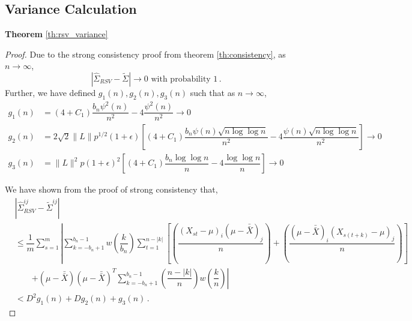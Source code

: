 \documentclass[12pt]{article}
\theoremstyle{remark}
\begin{document}
\subsection{Variance Calculation}
\label{appendix:variance}
\textbf{Theorem } \ref{th:rsv_variance}
\begin{proof}
 Due to the strong consistency proof from theorem \ref{th:consistency}, as $n \to \infty$,
\begin{equation}
\label{eq:rsv_asv_consis}
 \left|\hat{\Sigma}_{RSV} -  \tilde{\Sigma}\right| \to 0 \text{ with probability 1}\,. 
\end{equation}
Further, we have defined $g_1(n), g_2(n), g_3(n)$ such that as $n \to \infty$,
\begin{align*}
    g_1(n) &= (4+C_1)\dfrac{b_n \psi^2(n)}{n^2} - 4\dfrac{\psi^2(n)}{n^2} \to 0\\
    g_2(n) &= 2\sqrt{2}\|L\|p^{1/2}(1+\epsilon)\left[(4+C_1)\dfrac{b_n\psi(n)\sqrt{n\log \log n}}{n^2} - 4\dfrac{\psi(n)\sqrt{n\log \log n}}{n^2}\right] \to 0\\
    g_3(n) &= \|L\|^2 p (1+\epsilon)^2\left[(4+C_1)\dfrac{b_n \log\log n}{n} - 4 \dfrac{\log \log n}{n}\right] \to 0
\end{align*}

We have shown from the proof of strong consistency that,
\begin{align*}
 &\left| \hat{\Sigma}_{RSV}^{ij} - \tilde{\Sigma}^{ij} \right|\\
 & \leq \dfrac{1}{m} \sum_{s=1}^m \left| \sum_{k=-b_n+1}^{b_n-1} w \left(\dfrac{k}{b_n} \right) \sum_{t=1}^{n-|k|}   \left[ \left( \dfrac{(X_{st} - \mu)_i(\mu-\bar{\bar{X}})_j}{n}\right)+ \left(\dfrac{(\mu-\bar{\bar{X}})_i(X_{s(t+k)}-\mu)_j}{n}\right) \right] \right.\\
& \quad \quad  \left. + (\mu-\bar{\bar{X}})(\mu-\bar{\bar{X}})^T\sum_{k=-b_n+1}^{b_n-1}\left(\dfrac{n-|k|}{n}\right)w\left(\dfrac{k}{n}\right) \right| \\ 
 & < D^2g_1(n) + Dg_2(n) + g_3(n)\,.
\end{align*}


\end{proof}
\end{document}
